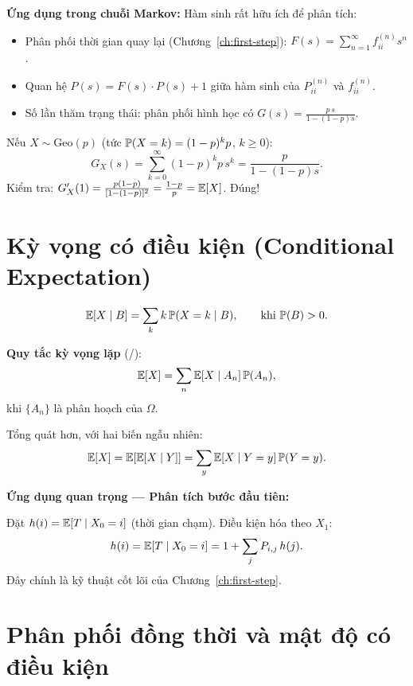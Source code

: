 \textbf{Ứng dụng trong chuỗi Markov:} Hàm sinh rất hữu ích để phân tích:
\begin{itemize}[nosep]
  \item Phân phối thời gian quay lại (Chương~\ref{ch:first-step}): $F(s) = \sum_{n=1}^{\infty} f_{ii}^{(n)} s^n$.
  \item Quan hệ $P(s) = F(s) \cdot P(s) + 1$ giữa hàm sinh của $P_{ii}^{(n)}$ và $f_{ii}^{(n)}$.
  \item Số lần thăm trạng thái: phân phối hình học có $G(s) = \frac{p\, s}{1 - (1-p)s}$.
\end{itemize}

\begin{example}
Nếu $X \sim \text{Geo}(p)$ (tức $\mathbb{P}(X = k) = (1-p)^k p$, $k \geq 0$):
\[
  G_X(s) = \sum_{k=0}^{\infty} (1-p)^k p\, s^k = \frac{p}{1 - (1-p)s}.
\]
Kiểm tra: $G_X'(1) = \frac{p(1-p)}{[1-(1-p)]^2} = \frac{1-p}{p} = \mathbb{E}[X]$. Đúng!
\end{example}

\section{Kỳ vọng có điều kiện (Conditional Expectation)}

\begin{dinhnghia}
\[
  \mathbb{E}[X \mid B] = \sum_k k\,\mathbb{P}(X = k \mid B), \qquad \text{khi } \mathbb{P}(B) > 0.
\]
\end{dinhnghia}

\textbf{Quy tắc kỳ vọng lặp} (/):
\[
  \mathbb{E}[X] = \sum_{n} \mathbb{E}[X \mid A_n]\,\mathbb{P}(A_n),
\]
khi $\{A_n\}$ là phân hoạch của $\Omega$.

Tổng quát hơn, với hai biến ngẫu nhiên:
\[
  \mathbb{E}[X] = \mathbb{E}[\mathbb{E}[X \mid Y]] = \sum_y \mathbb{E}[X \mid Y = y]\,\mathbb{P}(Y = y).
\]

\textbf{Ứng dụng quan trọng --- Phân tích bước đầu tiên:}

Đặt $h(i) = \mathbb{E}[T \mid X_0 = i]$ (thời gian chạm). Điều kiện hóa theo $X_1$:
\[
  h(i) = \mathbb{E}[T \mid X_0 = i] = 1 + \sum_j P_{i,j}\, h(j).
\]
Đây chính là kỹ thuật cốt lõi của Chương~\ref{ch:first-step}.

\section{Phân phối đồng thời và mật độ có điều kiện}

